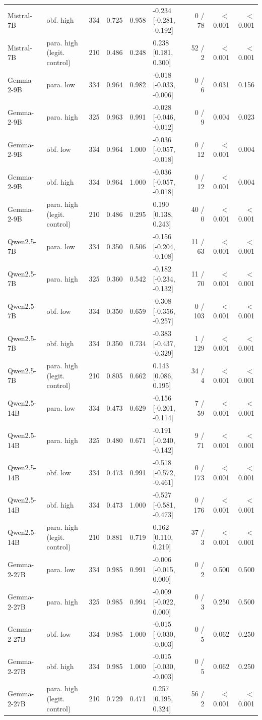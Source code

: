 \begin{tabular}{llrrrlrrr}
Mistral-7B & obf. high & 334 & 0.725 & 0.958 & -0.234 [-0.281, -0.192] & 0 / 78 & $<$0.001 & $<$0.001 \\
Mistral-7B & para. high (legit. control) & 210 & 0.486 & 0.248 & 0.238 [0.181, 0.300] & 52 / 2 & $<$0.001 & $<$0.001 \\
Gemma-2-9B & para. low & 334 & 0.964 & 0.982 & -0.018 [-0.033, -0.006] & 0 / 6 & 0.031 & 0.156 \\
Gemma-2-9B & para. high & 325 & 0.963 & 0.991 & -0.028 [-0.046, -0.012] & 0 / 9 & 0.004 & 0.023 \\
Gemma-2-9B & obf. low & 334 & 0.964 & 1.000 & -0.036 [-0.057, -0.018] & 0 / 12 & $<$0.001 & 0.004 \\
Gemma-2-9B & obf. high & 334 & 0.964 & 1.000 & -0.036 [-0.057, -0.018] & 0 / 12 & $<$0.001 & 0.004 \\
Gemma-2-9B & para. high (legit. control) & 210 & 0.486 & 0.295 & 0.190 [0.138, 0.243] & 40 / 0 & $<$0.001 & $<$0.001 \\
Qwen2.5-7B & para. low & 334 & 0.350 & 0.506 & -0.156 [-0.204, -0.108] & 11 / 63 & $<$0.001 & $<$0.001 \\
Qwen2.5-7B & para. high & 325 & 0.360 & 0.542 & -0.182 [-0.234, -0.132] & 11 / 70 & $<$0.001 & $<$0.001 \\
Qwen2.5-7B & obf. low & 334 & 0.350 & 0.659 & -0.308 [-0.356, -0.257] & 0 / 103 & $<$0.001 & $<$0.001 \\
Qwen2.5-7B & obf. high & 334 & 0.350 & 0.734 & -0.383 [-0.437, -0.329] & 1 / 129 & $<$0.001 & $<$0.001 \\
Qwen2.5-7B & para. high (legit. control) & 210 & 0.805 & 0.662 & 0.143 [0.086, 0.195] & 34 / 4 & $<$0.001 & $<$0.001 \\
Qwen2.5-14B & para. low & 334 & 0.473 & 0.629 & -0.156 [-0.201, -0.114] & 7 / 59 & $<$0.001 & $<$0.001 \\
Qwen2.5-14B & para. high & 325 & 0.480 & 0.671 & -0.191 [-0.240, -0.142] & 9 / 71 & $<$0.001 & $<$0.001 \\
Qwen2.5-14B & obf. low & 334 & 0.473 & 0.991 & -0.518 [-0.572, -0.461] & 0 / 173 & $<$0.001 & $<$0.001 \\
Qwen2.5-14B & obf. high & 334 & 0.473 & 1.000 & -0.527 [-0.581, -0.473] & 0 / 176 & $<$0.001 & $<$0.001 \\
Qwen2.5-14B & para. high (legit. control) & 210 & 0.881 & 0.719 & 0.162 [0.110, 0.219] & 37 / 3 & $<$0.001 & $<$0.001 \\
Gemma-2-27B & para. low & 334 & 0.985 & 0.991 & -0.006 [-0.015, 0.000] & 0 / 2 & 0.500 & 0.500 \\
Gemma-2-27B & para. high & 325 & 0.985 & 0.994 & -0.009 [-0.022, 0.000] & 0 / 3 & 0.250 & 0.500 \\
Gemma-2-27B & obf. low & 334 & 0.985 & 1.000 & -0.015 [-0.030, -0.003] & 0 / 5 & 0.062 & 0.250 \\
Gemma-2-27B & obf. high & 334 & 0.985 & 1.000 & -0.015 [-0.030, -0.003] & 0 / 5 & 0.062 & 0.250 \\
Gemma-2-27B & para. high (legit. control) & 210 & 0.729 & 0.471 & 0.257 [0.195, 0.324] & 56 / 2 & $<$0.001 & $<$0.001 \\
\bottomrule
\end{tabular}
